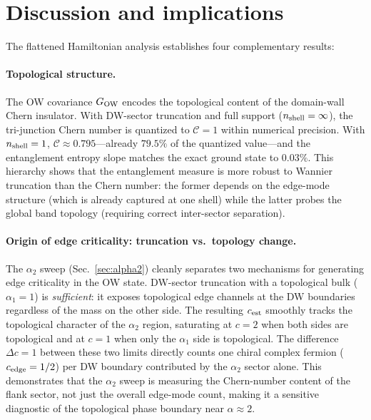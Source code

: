 \documentclass[aps,prb,twocolumn,showpacs,floatfix]{revtex4-2}
\newcommand{\nshell}{n_{\rm shell}}
\newcommand{\Cchern}{\mathcal{C}}
\newcommand{\GO}{G_{\rm OW}}
\begin{document}
\section{Discussion and implications}
\label{sec:discussion}

The flattened Hamiltonian analysis establishes four complementary results:

\paragraph{Topological structure.}
The OW covariance $\GO$ encodes the topological content of the domain-wall
Chern insulator.
With DW-sector truncation and full support ($\nshell = \infty$), the tri-junction
Chern number is quantized to $\Cchern = 1$ within numerical precision.
With $\nshell = 1$, $\Cchern \approx 0.795$---already $79.5\%$ of the
quantized value---and the entanglement entropy slope matches the exact ground state
to $0.03\%$.
This hierarchy shows that the entanglement measure is more robust to Wannier
truncation than the Chern number: the former depends on the edge-mode structure
(which is already captured at one shell) while the latter probes the global band topology
(requiring correct inter-sector separation).

\paragraph{Origin of edge criticality: truncation vs.\ topology change.}
The $\alpha_2$ sweep (Sec.~\ref{sec:alpha2}) cleanly separates two mechanisms for
generating edge criticality in the OW state.
DW-sector truncation with a topological bulk ($\alpha_1 = 1$) is \emph{sufficient}:
it exposes topological edge channels at the DW boundaries regardless of the
mass on the other side.
The resulting $c_{\rm est}$ smoothly tracks the topological character of the
$\alpha_2$ region, saturating at $c = 2$ when both sides are topological and
at $c = 1$ when only the $\alpha_1$ side is topological.
The difference $\Delta c = 1$ between these two limits directly counts one
chiral complex fermion ($c_{\rm edge} = 1/2$) per DW boundary contributed
by the $\alpha_2$ sector alone.
This demonstrates that the $\alpha_2$ sweep is measuring the Chern-number content
of the flank sector, not just the overall edge-mode count, making it a sensitive
diagnostic of the topological phase boundary near $\alpha \approx 2$.
\end{document}
